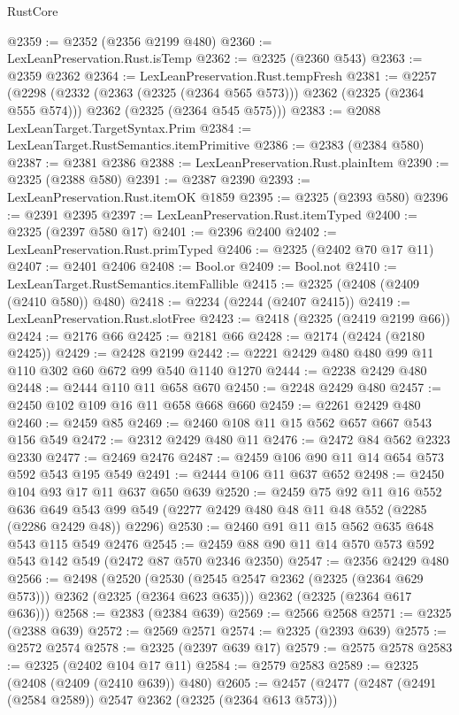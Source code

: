 \begin{lexlean}{RustCore}
\begin{coremodule}
@2359 := @2352 (@2356 @2199 @480)
@2360 := LexLeanPreservation.Rust.isTemp
@2362 := @2325 (@2360 @543)
@2363 := @2359 @2362
@2364 := LexLeanPreservation.Rust.tempFresh
@2381 := @2257
    (@2298
      (@2332 (@2363 (@2325 (@2364 @565 @573))) @2362 (@2325 (@2364 @555 @574)))
      @2362
      (@2325 (@2364 @545 @575)))
@2383 := @2088 LexLeanTarget.TargetSyntax.Prim
@2384 := LexLeanTarget.RustSemantics.itemPrimitive
@2386 := @2383 (@2384 @580)
@2387 := @2381 @2386
@2388 := LexLeanPreservation.Rust.plainItem
@2390 := @2325 (@2388 @580)
@2391 := @2387 @2390
@2393 := LexLeanPreservation.Rust.itemOK @1859
@2395 := @2325 (@2393 @580)
@2396 := @2391 @2395
@2397 := LexLeanPreservation.Rust.itemTyped
@2400 := @2325 (@2397 @580 @17)
@2401 := @2396 @2400
@2402 := LexLeanPreservation.Rust.primTyped
@2406 := @2325 (@2402 @70 @17 @11)
@2407 := @2401 @2406
@2408 := Bool.or
@2409 := Bool.not
@2410 := LexLeanTarget.RustSemantics.itemFallible
@2415 := @2325 (@2408 (@2409 (@2410 @580)) @480)
@2418 := @2234 (@2244 (@2407 @2415))
@2419 := LexLeanPreservation.Rust.slotFree
@2423 := @2418 (@2325 (@2419 @2199 @66))
@2424 := @2176 @66
@2425 := @2181 @66
@2428 := @2174 (@2424 (@2180 @2425))
@2429 := @2428 @2199
@2442 := @2221 @2429 @480 @480 @99 @11 @110 @302 @60 @672 @99 @540 @1140 @1270
@2444 := @2238 @2429 @480
@2448 := @2444 @110 @11 @658 @670
@2450 := @2248 @2429 @480
@2457 := @2450 @102 @109 @16 @11 @658 @668 @660
@2459 := @2261 @2429 @480
@2460 := @2459 @85
@2469 := @2460 @108 @11 @15 @562 @657 @667 @543 @156 @549
@2472 := @2312 @2429 @480 @11
@2476 := @2472 @84 @562 @2323 @2330
@2477 := @2469 @2476
@2487 := @2459 @106 @90 @11 @14 @654 @573 @592 @543 @195 @549
@2491 := @2444 @106 @11 @637 @652
@2498 := @2450 @104 @93 @17 @11 @637 @650 @639
@2520 := @2459
    @75
    @92
    @11
    @16
    @552
    @636
    @649
    @543
    @99
    @549
    (@2277 @2429 @480 @48 @11 @48 @552 (@2285 (@2286 @2429 @48)) @2296)
@2530 := @2460 @91 @11 @15 @562 @635 @648 @543 @115 @549 @2476
@2545 := @2459 @88 @90 @11 @14 @570 @573 @592 @543 @142 @549 (@2472 @87 @570 @2346 @2350)
@2547 := @2356 @2429 @480
@2566 := @2498
    (@2520
      (@2530 (@2545 @2547 @2362 (@2325 (@2364 @629 @573))) @2362 (@2325 (@2364 @623 @635)))
      @2362
      (@2325 (@2364 @617 @636)))
@2568 := @2383 (@2384 @639)
@2569 := @2566 @2568
@2571 := @2325 (@2388 @639)
@2572 := @2569 @2571
@2574 := @2325 (@2393 @639)
@2575 := @2572 @2574
@2578 := @2325 (@2397 @639 @17)
@2579 := @2575 @2578
@2583 := @2325 (@2402 @104 @17 @11)
@2584 := @2579 @2583
@2589 := @2325 (@2408 (@2409 (@2410 @639)) @480)
@2605 := @2457
    (@2477
      (@2487 (@2491 (@2584 @2589)) @2547 @2362 (@2325 (@2364 @613 @573)))

\end{coremodule}
\end{lexlean}

